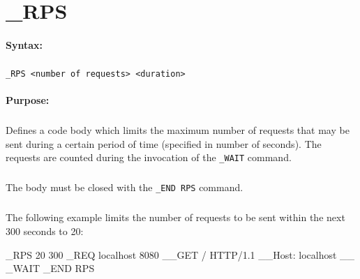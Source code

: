 
\newpage
\section{\_RPS}
\label{cmd:_RPS}

\paragraph{Syntax:}
\subparagraph{}
\texttt{\_RPS <number of requests> <duration>}

\paragraph{Purpose:}
\subparagraph{}
Defines a code body which limits the maximum number of requests 
that may be sent during a certain period of time (specified in number of seconds). 
The requests are counted during the invocation of the \texttt{\_WAIT} command.

\subparagraph{}
The body must be closed with the \texttt{\_END RPS} command.

\subparagraph{}
The following example limits the number of requests to be sent within 
the next 300 seconds to 20:

\begin{usplisting}
    _RPS 20 300
    _REQ localhost 8080
    __GET / HTTP/1.1
    __Host: localhost
    __
    _WAIT
    _END RPS
\end{usplisting}
